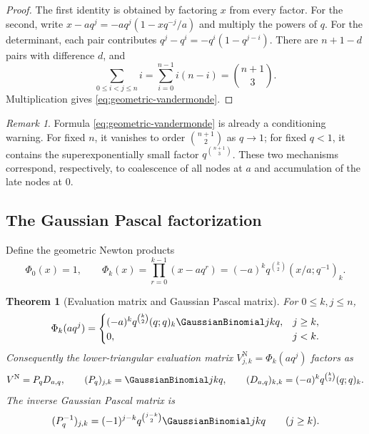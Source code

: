 \documentclass[11pt,a4paper,oneside]{article}
\newtheorem{theorem}{Theorem}[section]
\theoremstyle{definition}
\theoremstyle{remark}
\newtheorem{remark}[remark]{Remark}
\begin{document}
\begin{proof}
The first identity is obtained by factoring $x$ from every factor.  For the
second, write
$x-aq^j=-aq^j(1-xq^{-j}/a)$ and multiply the powers of $q$.
For the determinant, each pair contributes
$q^j-q^i=-q^i(1-q^{j-i})$.  There are $n+1-d$ pairs with difference $d$, and
\[
 \sum_{0\le i<j\le n}i
 =\sum_{i=0}^{n-1}i(n-i)=\binom{n+1}{3}.
\]
Multiplication gives \eqref{eq:geometric-vandermonde}.
\end{proof}

\begin{remark}
Formula \eqref{eq:geometric-vandermonde} is already a conditioning warning.
For fixed $n$, it vanishes to order $\binom{n+1}{2}$ as $q\to1$; for fixed
$q<1$, it contains the superexponentially small factor
$q^{\binom{n+1}{3}}$.  These two mechanisms correspond, respectively, to
coalescence of all nodes at $a$ and accumulation of the late nodes at $0$.
\end{remark}

\subsection{The Gaussian Pascal factorization}

Define the geometric Newton products
\begin{equation}
 \Phi_0(x)=1,
 \qquad
 \Phi_k(x)=\prod_{r=0}^{k-1}(x-aq^r)
 =(-a)^kq^{\binom k2}(x/a;q^{-1})_k.
 \label{eq:newton-products}
\end{equation}

\begin{theorem}[Evaluation matrix and Gaussian Pascal matrix]
\label{thm:pascal-factorization}
For $0\le k,j\le n$,
\begin{equation}
 \Phi_k(aq^j)=
 \begin{cases}
 (-a)^kq^{\binom k2}(q;q)_k\GaussianBinomial jkq,&j\ge k,\\
 0,&j<k.
 \end{cases}
 \label{eq:newton-evaluation}
\end{equation}
Consequently the lower-triangular evaluation matrix
$V^{\mathrm N}_{j,k}=\Phi_k(aq^j)$ factors as
\begin{equation}
 V^{\mathrm N}=P_qD_{a,q},
 \qquad
 (P_q)_{j,k}=\GaussianBinomial jkq,
 \qquad
 (D_{a,q})_{k,k}=(-a)^kq^{\binom k2}(q;q)_k.
 \label{eq:pascal-matrix-factorization}
\end{equation}
The inverse Gaussian Pascal matrix is
\begin{equation}
 (P_q^{-1})_{j,k}
 =(-1)^{j-k}q^{\binom{j-k}{2}}\GaussianBinomial jkq
 \qquad (j\ge k).
 \label{eq:q-pascal-inverse}
\end{equation}
\end{theorem}
\end{document}
